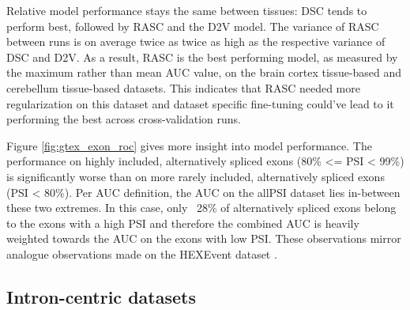 Relative model performance stays the same between tissues: DSC tends to perform best, followed by RASC and the D2V model. The variance of RASC between runs is on average twice as twice as high as the respective variance of DSC and D2V. As a result, RASC is the best performing model, as measured by the maximum rather than mean AUC value, on the brain cortex tissue-based and cerebellum tissue-based datasets. This indicates that RASC needed more regularization on this dataset and dataset specific fine-tuning could've lead to it performing the best across cross-validation runs.

Figure \ref{fig:gtex_exon_roc} gives more insight into model performance. 
The performance on highly included, alternatively spliced exons (80\% <= PSI < 99\%) is significantly worse than on more rarely included, alternatively spliced exons (PSI < 80\%). Per AUC definition, the AUC on the allPSI dataset lies in-between these two extremes. In this case, only ~28\% of alternatively spliced exons belong to the exons with a high PSI and therefore the combined AUC is heavily weighted towards the AUC on the exons with low PSI. These observations mirror analogue observations made on the HEXEvent dataset \cite{dsc}.



%	




	
	
	

\subsection{Intron-centric datasets} \label{subsec:gtex_junc}

